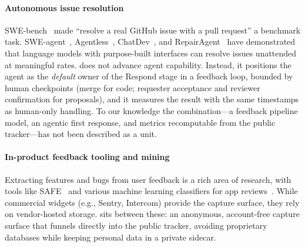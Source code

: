 \paragraph{Autonomous issue resolution}
SWE-bench~\cite{jimenez2024swebench} made ``resolve a real GitHub issue with a pull request'' a benchmark task. SWE-agent~\cite{yang2024sweagent}, Agentless~\cite{xia2024agentless}, ChatDev~\cite{qian2023chatdev}, and RepairAgent~\cite{bouzenia2024repairagent} have demonstrated that language models with purpose-built interfaces can resolve issues unattended at meaningful rates. \ffrs{} does not advance agent capability. Instead, it positions the agent as the \emph{default} owner of the Respond stage in a feedback loop, bounded by human checkpoints (merge for code; requester acceptance and reviewer confirmation for proposals), and it measures the result with the same timestamps as human-only handling. To our knowledge the combination---a feedback pipeline model, an agentic first response, and metrics recomputable from the public tracker---has not been described as a unit.

\paragraph{In-product feedback tooling and mining}
Extracting features and bugs from user feedback is a rich area of research, with tools like SAFE~\cite{johann2017safe} and various machine learning classifiers for app reviews~\cite{panichella2015how, guzman2014how}. While commercial widgets (e.g., Sentry, Intercom) provide the capture surface, they rely on vendor-hosted storage. \ffrs{} sits between these: an anonymous, account-free capture surface that funnels directly into the public tracker, avoiding proprietary databases while keeping personal data in a private sidecar.
